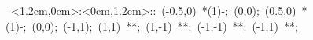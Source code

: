 %


\hbox{
\xy    <1.2cm,0cm>:<0cm,1.2cm>::
       (-0.5,0) *\ellipse(1){-}; (0,0); 
       (0.5,0) *\ellipse(1){-}; (0,0); 
       (-1,1); (1,1) **\dir{-}; 
       (1,-1) **\dir{-}; 
       (-1,-1) **\dir{-};
       (-1,1) **\dir{-};
\endxy}


